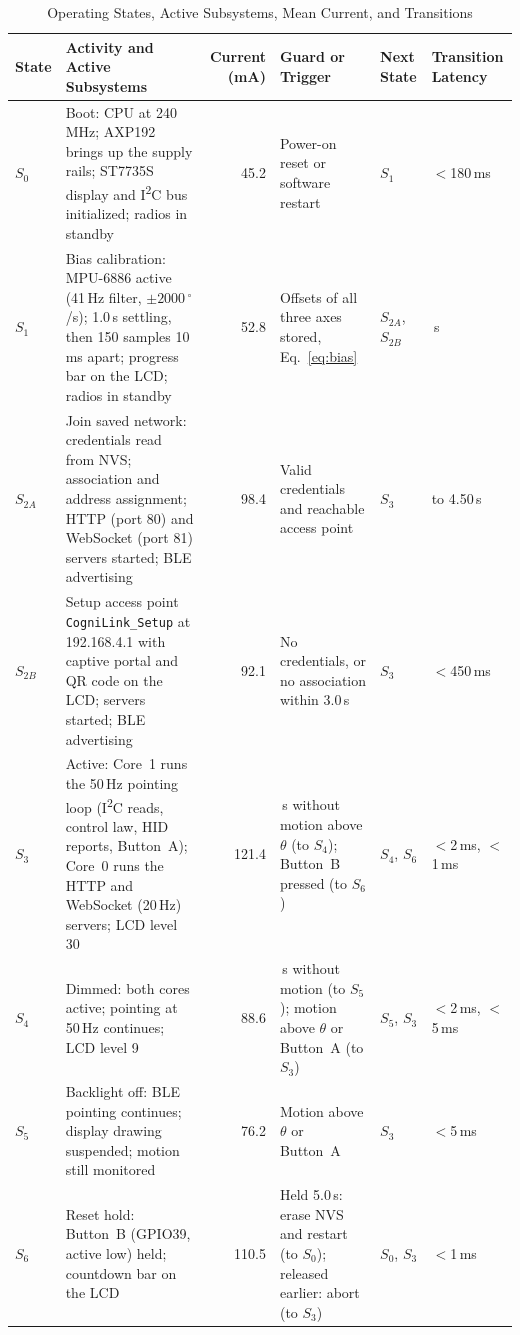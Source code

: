 \documentclass[journal]{IEEEtran}
\newcommand{\dps}{\ensuremath{^{\circ}}/s}
\begin{document}
\begin{table}[!t]
\caption{Operating States, Active Subsystems, Mean Current, and Transitions}
\label{tab:states}
\centering
\footnotesize
\renewcommand{\arraystretch}{1.15}
\setlength{\tabcolsep}{4pt}
\begin{tabular}{@{}l>{\raggedright\arraybackslash}p{6.3cm}r>{\raggedright\arraybackslash}p{4.6cm}l>{\raggedright\arraybackslash}p{1.9cm}@{}}
\toprule
State & Activity and Active Subsystems & Current (mA) & Guard or Trigger & Next State & Transition Latency \\
\midrule
\textbf{$S_0$} & Boot: CPU at 240\,MHz; AXP192 brings up the supply rails; ST7735S display and I\textsuperscript{2}C bus initialized; radios in standby & 45.2 & Power-on reset or software restart & $S_1$ & $<$180\,ms \\
\textbf{$S_1$} & Bias calibration: MPU-6886 active (41\,Hz filter, $\pm2000$\,\dps); 1.0\,s settling, then 150 samples 10\,ms apart; progress bar on the LCD; radios in standby & 52.8 & Offsets of all three axes stored, Eq.~\eqref{eq:bias} & $S_{2A}$, $S_{2B}$ & 2.50\,s \\
\textbf{$S_{2A}$} & Join saved network: credentials read from NVS; association and address assignment; HTTP (port 80) and WebSocket (port 81) servers started; BLE advertising & 98.4 & Valid credentials and reachable access point & $S_3$ & 1.20 to 4.50\,s \\
\textbf{$S_{2B}$} & Setup access point \texttt{CogniLink\_Setup} at 192.168.4.1 with captive portal and QR code on the LCD; servers started; BLE advertising & 92.1 & No credentials, or no association within 3.0\,s & $S_3$ & $<$450\,ms \\
\textbf{$S_3$} & Active: Core~1 runs the 50\,Hz pointing loop (I\textsuperscript{2}C reads, control law, HID reports, Button~A); Core~0 runs the HTTP and WebSocket (20\,Hz) servers; LCD level 30 & 121.4 & 30\,s without motion above $\theta$ (to $S_4$); Button~B pressed (to $S_6$) & $S_4$, $S_6$ & $<$2\,ms, $<$1\,ms \\
\textbf{$S_4$} & Dimmed: both cores active; pointing at 50\,Hz continues; LCD level 9 & 88.6 & 60\,s without motion (to $S_5$); motion above $\theta$ or Button~A (to $S_3$) & $S_5$, $S_3$ & $<$2\,ms, $<$5\,ms \\
\textbf{$S_5$} & Backlight off: BLE pointing continues; display drawing suspended; motion still monitored & 76.2 & Motion above $\theta$ or Button~A & $S_3$ & $<$5\,ms \\
\textbf{$S_6$} & Reset hold: Button~B (GPIO39, active low) held; countdown bar on the LCD & 110.5 & Held 5.0\,s: erase NVS and restart (to $S_0$); released earlier: abort (to $S_3$) & $S_0$, $S_3$ & $<$1\,ms \\
\bottomrule
\end{tabular}
\end{table}
\end{document}
